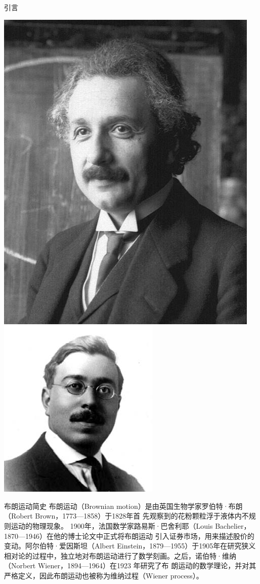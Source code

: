 \documentclass[t]{beamer}
\begin{document}
\begin{frame}{引言}
\begin{center}
\includegraphics[height=.35\textheight]{fig/einstein.jpg}
\includegraphics[height=.35\textheight]{fig/wiener.jpeg}
    \end{center}
  \end{frame}

\begin{frame}{布朗运动简史}
  布朗运动（Brownian motion）是由英国生物学家罗伯特·布朗（Robert Brown，1773---1858）于1828年首
先观察到的花粉颗粒浮于液体内不规则运动的物理现象。
1900年，法国数学家路易斯·巴舍利耶（Louis Bachelier，1870---1946）在他的博士论文中正式将布朗运动
引入证券市场，用来描述股价的变动。阿尔伯特·爱因斯坦（Albert Einstein，1879---1955）于1905年在研究狭义相对论的过程中，独立地对布朗运动进行了数学刻画。之后，诺伯特·维纳（Norbert Wiener，1894---1964）在1923 年研究了布
朗运动的数学理论，并对其严格定义，因此布朗运动也被称为维纳过程（Wiener process）。
\end{frame}
\end{document}
